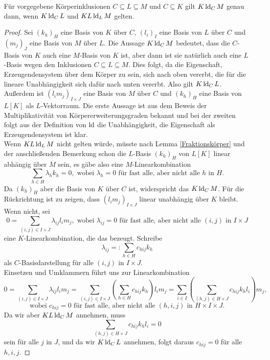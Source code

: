     \begin{lemma}\label{Stapellemma}
    	Für vorgegebene Körperinklusionen $C\subseteq L\subseteq M$ und $C\subseteq K$ gilt $K\operatorname{ld}_CM$ genau dann, wenn $K\operatorname{ld}_CL$ und $KL\operatorname{ld}_LM$ gelten.
    \end{lemma}
    \begin{proof}
    	Sei $(k_h)_H$ eine Basis von $K$ über $C$, $(l_i)_I$ eine Basis von $L$ über $C$ und $(m_j)_J$ eine Basis von $M$ über $L$. Die Aussage $K\operatorname{ld}_CM$ bedeutet, dass die $C$-Basis von $K$ auch eine $M$-Basis von $K$ ist, aber dann ist sie natürlich auch eine $L$-Basis wegen den Inklusionen $C\subseteq L\subseteq M$. Dies folgt, da die Eigenschaft, Erzeugendensystem über dem Körper zu sein, sich nach oben vererbt, die für die lineare Unabhängigkeit sich dafür nach unten vererbt. Also gilt $K\operatorname{ld}_CL$.\\
    	Außerdem ist $(l_im_j)_{I\times J}$ eine Basis von $M$ über $C$ und $(k_h)_H$ eine Basis von $L[K]$ als $L$-Vektorraum. Die erste Aussage ist aus dem Beweis der Multiplikativität von Körpererweiterungsgraden bekannt und bei der zweiten folgt aus der Definition von $\operatorname{ld}$ die Unabhängigkeit, die Eigenschaft als Erzeugendensystem ist klar.\\
    	Wenn $KL\operatorname{ld}_LM$ nicht gelten würde, müsste nach Lemma \ref{Fraktionskörper} und der anschließenden Bemerkung schon die $L$-Basis $(k_h)_H$ von $L[K]$ linear abhängig über $M$ sein, es gäbe also eine $M$-Linearkombination $$\sum\limits_{h\in H}\lambda_hk_h=0,\text{ wobei }\lambda_h=0\text{ für fast alle, aber nicht alle } h\text{ in }H.$$
    	Da $(k_h)_H$ aber die Basis von $K$ über $C$ ist, widerspricht das $K\operatorname{ld}_CM$.\newpage
    	Für die Rückrichtung ist zu zeigen, dass $(l_im_j)_{I\times J}$ linear unabhängig über $K$ bleibt. Wenn nicht, sei $$0=\sum\limits_{(i,j)\in I\times J}\lambda_{ij}l_im_j,\text{ wobei }\lambda_{ij}=0\text{ für fast alle, aber nicht alle } (i,j)\text{ in }I\times J$$ eine $K$-Linearkombination, die das bezeugt. Schreibe $$\lambda_{ij}=:\sum\limits_{h\in H}c_{hij}k_h$$ als $C$-Basisdarstellung für alle $(i,j)$ in $I\times J$.\\
    	Einsetzen und Umklammern führt uns zur Linearkombination $$0=\sum\limits_{(i,j)\in I\times J}\lambda_{ij}l_im_j=\sum\limits_{(i,j)\in I\times J}\left(\sum\limits_{h\in H} c_{hij}k_h\right)l_im_j=\sum\limits_{i\in I}\left(\sum\limits_{(h,j)\in H\times J}c_{hij}k_hl_i\right)m_j,$$ $$\text{wobei }c_{hij}=0\text{ für fast alle, aber nicht alle } (h,i,j)\text{ in }H\times I\times J.$$
    	Da wir aber $KL\operatorname{ld}_CM$ annehmen, muss $$\sum\limits_{(h,j)\in H\times J}c_{hij}k_hl_i=0$$ sein für alle $j$ in $J$, und da wir $K\operatorname{ld}_CL$ annehmen, folgt daraus $c_{hij}=0$ für alle $h,i,j$.
    \end{proof}
    
